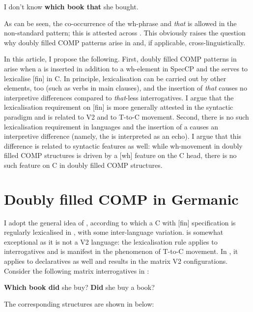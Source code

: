 \documentclass[output=paper,modfonts, hidelinks, newtxmath]{langscibook}
\begin{document}
\ea
	  I don't know \textbf{which book that} she bought. \label{whichbookthat} 
\z
\largerpage

\noindent As can be seen, the co-occurrence of the wh-phrase and \textit{that} is allowed in the non-standard pattern; this is attested across . This obviously raises the question why doubly filled COMP patterns arise in  and, if applicable, cross-linguistically.

In this article, I propose the following. First, doubly filled COMP patterns in  arise when a  is inserted in addition to a wh-element in SpecCP and the  serves to lexicalise [fin] in C. In principle, lexicalisation can be carried out by other elements, too (such as verbs in main clauses), and the insertion of \textit{that} causes no interpretive differences compared to \textit{that}-less interrogatives. I argue that the lexicalisation requirement on [fin] is more generally attested in the syntactic paradigm and is related to V2 and to T-to-C movement. Second, there is no such lexicalisation requirement in  languages and the insertion of a  causes an interpretive difference (namely, the  is interpreted as an echo). I argue that this difference is related to syntactic features as well: while wh-movement in  doubly filled COMP structures is driven by a [wh] feature on the C head, there is no such feature on C in  doubly filled COMP structures.

\section{Doubly filled COMP in Germanic}
\largerpage %
I adopt the general idea of \citet{bacskaiatkaritoappear}, according to which a C with  [fin] specification is regularly lexicalised in , with some inter-language variation.  is somewhat exceptional as it is not a V2 language: the lexicalisation rule applies to interrogatives and is manifest in the phenomenon of T-to-C movement. In , it applies to declaratives as well and results in the matrix V2 configurations. Consider the following matrix interrogatives in :

\ea
	\ea \textbf{Which book did} she buy? 
	\ex \textbf{Did} she buy a book? 
	\z
\z

\noindent The corresponding structures are shown in  below:
\end{document}
